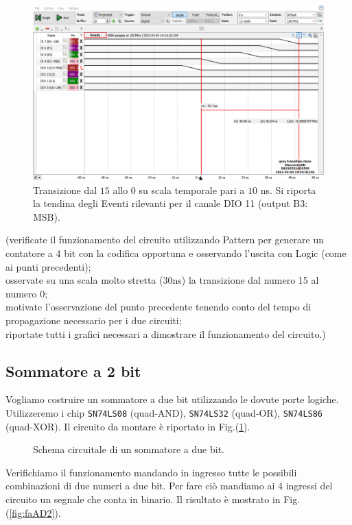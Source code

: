 \documentclass[10pt, a4paper, italian]{article}
\begin{document}
\begin{figure}[htb!]
    \centering
    \includegraphics[width=\textwidth]{gray10ns.png}
    \caption{Transizione dal $15$ allo $0$ su scala temporale pari a $10$ ns. Si riporta la tendina degli Eventi rilevanti per il canale DIO 11 (output B3: MSB).}
\end{figure}
(verificate il funzionamento del circuito utilizzando Pattern per generare un contatore a 4 bit con la codifica opportuna e osservando l’uscita con Logic (come ai punti precedenti);\\
osservate su una scala molto stretta (30ns) la transizione dal numero 15 al numero 0;\\
motivate l’osservazione del punto precedente tenendo conto del tempo di propagazione necessario per i due circuiti;\\
riportate tutti i grafici necessari a dimostrare il funzionamento del circuito.)

\subsection{Sommatore a 2 bit}
Vogliamo costruire un sommatore a due bit utilizzando le dovute porte logiche. Utilizzeremo i chip \texttt{SN74LS08} (quad-AND), \texttt{SN74LS32} (quad-OR), \texttt{SN74LS86} (quad-XOR). Il circuito da montare è riportato in Fig.(\ref{fig:fulladder}).

\begin{figure}[htbp]
    \centering
    \caption{Schema circuitale di un sommatore a due bit.}
    \label{fig:fulladder}
\end{figure}

Verifichiamo il funzionamento mandando in ingresso tutte le possibili combinazioni di due numeri a due bit. Per fare ciò mandiamo ai 4 ingressi del circuito un segnale che conta in binario. Il risultato è mostrato in Fig.(\ref{fig:faAD2}).
\end{document}
